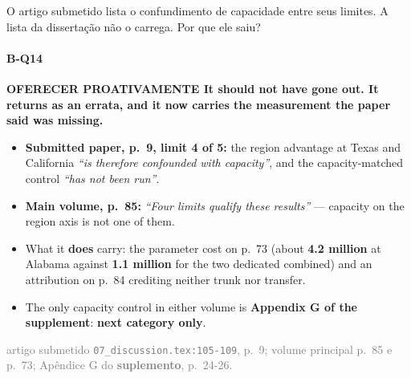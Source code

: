 \documentclass{beamer}
\begin{document}
\begin{frame}[noframenumbering]{O artigo submetido lista o confundimento de capacidade entre seus limites. A lista da dissertação não o carrega. Por que ele saiu?}
    \framesubtitle{B-Q14}
    \hypertarget{bq14}{}
    \small\textcolor{alert}{\textbf{OFERECER PROATIVAMENTE \textbullet{} It should not have gone out. It returns as an errata, and it now carries the measurement the paper said was missing.}}
    \begin{itemize}\setlength{\itemsep}{0pt}\setlength{\parskip}{0pt}
        \item \textbf{Submitted paper, p.~9, limit 4 of 5:} the region advantage at Texas and California \textit{``is therefore confounded with capacity''}, and the capacity-matched control \textit{``has not been run''}.
        \item \textbf{Main volume, p.~85:} \textit{``Four limits qualify these results''} --- capacity on the region axis is not one of them.
        \item What it \textbf{does} carry: the parameter cost on p.~73 (about \textbf{4.2 million} at Alabama against \textbf{1.1 million} for the two dedicated combined) and an attribution on p.~84 crediting neither trunk nor transfer.
        \item The only capacity control in either volume is \textbf{Appendix G of the supplement}: \textbf{next category only}.
    \end{itemize}
    \vfill
    {\scriptsize
    \begin{minipage}[b]{0.775\linewidth}\raggedright\textcolor{gray}{artigo submetido \texttt{07\_discussion.tex:105-109}, p.~9; volume principal p.~85 e p.~73; Apêndice G do \textbf{suplemento}, p.~24-26.}\end{minipage}\hfill
    \begin{minipage}[b]{0.20\linewidth}\raggedleft \hyperlink{bp1}{}\hyperlink{b0}{}\end{minipage}}
\end{frame}
\end{document}
